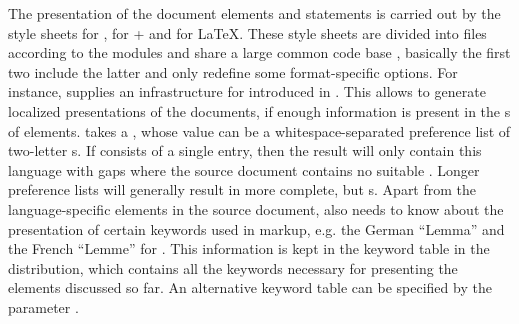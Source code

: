 \begin{omgroup}[id=transform-xsl,short=Transforming OMDoc]
The presentation of the {\omdoc} document elements and statements is carried out by the
style sheets {} for {\xhtml}, {} for
{\xhtml}+{\mathml} and {} for {\LaTeX}. These style sheets are
divided into files according to the {\omdoc} modules and share a large common code base
{}, basically the first two include the latter and only
redefine some format-specific options. For instance, {}
supplies an infrastructure for {} introduced in
{}. This allows to generate localized presentations of the {\omdoc}
documents, if enough information is present in the
{s} of
{} elements. {} takes a {}
{}, whose value can be a whitespace-separated preference list of
{} two-letter {s}.  If
{} consists of a single entry, then the result will only contain
this language with gaps where the source document contains no suitable {}.
Longer {} preference lists will generally result in more
complete, but {s}. Apart from the language-specific
elements in the source document, {} also needs to know about the
presentation of certain keywords used in {\omdoc} markup, e.g.  the German ``Lemma'' and
the French ``Lemme'' for {}. This information is kept in
the keyword table {} in the {\omdoc} distribution, which contains
all the keywords necessary for presenting the {\omdoc} elements discussed so far.  An
alternative keyword table can be specified by the parameter {}
{}.
\end{omgroup}


